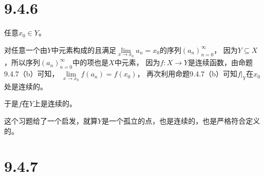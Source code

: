\documentclass{article}
\begin{document}
\section*{9.4.6}

任意$x_0 \in Y$。

对任意一个由$Y$中元素构成的且满足$\lim\limits_{x \rightarrow x_0} a_n = x_0$的序列$(a_n)_{n=0}^\infty$，
因为$Y \subseteq X$，所以序列$(a_n)_{n=0}^\infty$中的项也是$X$中元素，
因为$f: X \rightarrow Y$是连续函数，由命题9.4.7（b）可知，
$\lim\limits_{x \rightarrow x_0} f(a_n) = f(x_0)$，
再次利用命题9.4.7（b）可知$f|_{Y}$在$x_0$处是连续的。

于是$f$在$Y$上是连续的。

\begin{zremark}
  这个习题给了一个启发，就算$Y$是一个孤立的点，也是连续的，也是严格符合定义的。
\end{zremark}

\section*{9.4.7}
\end{document}
